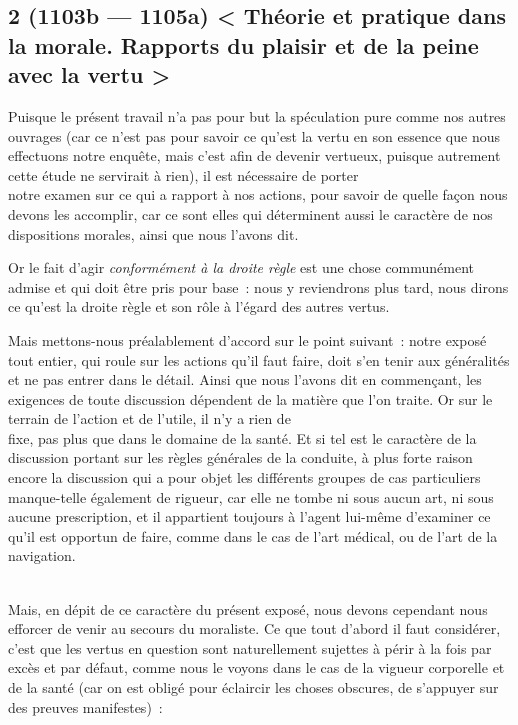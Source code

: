 \documentclass[french,twoside]{book} %
\begin{document}
\subsection[{2 (1103b — 1105a) < Théorie et pratique dans la morale. Rapports du plaisir et de la peine avec la vertu >}]{2 (1103b — 1105a) < Théorie et pratique dans la morale. Rapports du plaisir et de la peine avec la vertu >}
\noindent Puisque le présent travail n’a pas pour but la spéculation pure comme nos autres ouvrages (car ce n’est pas pour savoir ce qu’est la vertu en son essence que nous effectuons notre enquête, mais c’est afin de devenir vertueux, puisque autrement cette étude ne servirait à rien), il est nécessaire de porter \\
notre examen sur ce qui a rapport à nos actions, pour savoir de quelle façon nous devons les accomplir, car ce sont elles qui déterminent aussi le caractère de nos dispositions morales, ainsi que nous l’avons dit.\par
Or le fait d’agir {\itshape conformément à la droite règle} est une chose communément admise et qui doit être pris pour base : nous y reviendrons plus tard, nous dirons ce qu’est la droite règle et son rôle à l’égard des autres vertus.\par
 Mais mettons-nous préalablement d’accord sur le point suivant : notre exposé tout entier, qui roule sur les actions qu’il faut faire, doit s’en tenir aux généralités et ne pas entrer dans le détail. Ainsi que nous l’avons dit en commençant, les exigences de toute discussion dépendent de la matière que l’on traite. Or sur le terrain de l’action et de l’utile, il n’y a rien de \\
fixe, pas plus que dans le domaine de la santé. Et si tel est le caractère de la discussion portant sur les règles générales de la conduite, à plus forte raison encore la discussion qui a pour objet les différents groupes de cas particuliers manque-telle également de rigueur, car elle ne tombe ni sous aucun art, ni sous aucune prescription, et il appartient toujours à l’agent lui-même d’examiner ce qu’il est opportun de faire, comme dans le cas de l’art médical, ou de l’art de la navigation.\par
\\
Mais, en dépit de ce caractère du présent exposé, nous devons cependant nous efforcer de venir au secours du moraliste. Ce que tout d’abord il faut considérer, c’est que les vertus en question sont naturellement sujettes à périr à la fois par excès et par défaut, comme nous le voyons dans le cas de la vigueur corporelle et de la santé (car on est obligé pour éclaircir les choses obscures, de s’appuyer sur des preuves manifestes) : \\
\end{document}

